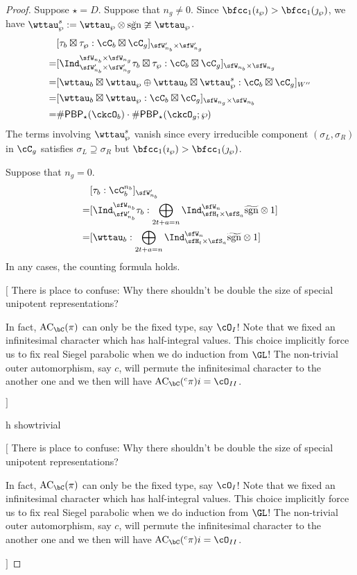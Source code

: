 \documentclass[12pt,a4paper]{amsart}
\newcommand{\trivial}[2][]{\if\relax\detokenize{#1}\relax
  {%
      \color{orange} \vspace{0em} $[$  #2 $]$
      \color{black}
  }
  \else
\ifx#1h
\ifcsname showtrivial\endcsname
{%
    \color{orange} \vspace{0em}  $[$ #2 $]$
    \color{black}
}
\fi
\else {\red Wrong argument!} \fi
\fi
}
\newcommand{\AC}{\mathrm{AC}}
\newcommand{\sgn}{\operatorname{sgn}}
\numberwithin{equation}{section}
\theoremstyle{remark}
\def\hsgn{\widetilde{\mathrm{sgn}}}
\def\PBP{\mathsf{PBP}}
\def\sP{\wp}
\def\brsgn{\breve{\sgn}}
\begin{document}
\begin{proof}
  \medskip

  Suppose $\star = D$.
  Suppose that $n_{g}\neq 0$.
  Since $\bfcc_{1}(\imath_{\wp})>\bfcc_{1}(\jmath_{\wp})$, we have
  $\wttau^{s}_{\wp}:=\wttau_{\wp}\otimes \brsgn\ncong\wttau_{\wp}$.
  \[
\begin{split}
  & [\tau_{b}\boxtimes \tau_{\wp} :
  \cC_{b} \boxtimes \cC_{g}]_{\sfW'_{n_{b}}\times \sfW'_{n_{g}}}\\
  = & [\Ind_{\sfW'_{n_{b}}\times \sfW'_{n_{g}}}^{\sfW_{n_{b}}\times \sfW_{n_{g}}} \tau_{b}\boxtimes \tau_{\wp} :
  \cC_{b} \boxtimes \cC_{g}]_{\sfW_{n_{b}}\times \sfW_{n_{g}}}\\
  = & [\wttau_{b}\boxtimes \wttau_{\wp}\oplus \wttau_{b}\boxtimes \wttau_{\wp}^{s}:
  \cC_{b} \boxtimes \cC_{g}]_{W''}\\
  = & [\wttau_{b}\boxtimes \wttau_{\wp}:
  \cC_{b} \boxtimes \cC_{g}]_{\sfW_{n_{g}}\times \sfW_{n_{b}}}\\
  =& \# \PBP_{\star}(\ckcO_{b})\cdot \# \PBP_{\star}(\ckcO_{g};\wp)
\end{split}
  \]
The terms involving $\wttau_{\sP}^{s}$ vanish since
every irreducible component $(\sigma_{L},\sigma_{R})$ in $\cC_{g}$ satisfies
    $\sigma_{L}\supseteq \sigma_{R}$ but $\bfcc_{1}(\imath_{\wp})>\bfcc_{1}(\jmath_{\wp})$.

  Suppose that $n_{g} =  0$.
  \[
    \begin{split}
      & [\tau_{b} : \cC_{b}^{n_{b}}]_{\sfW'_{n_{b}}}\\
      =& [\Ind_{\sfW'_{n_{b}}}^{\sfW_{n_{b}}} \tau_{b} : \bigoplus_{\substack{2t+a=n}}
      \Ind_{\sfH_{t}\times \sfS_{a}}^{\sfW_{n}} \hsgn\otimes 1] \\
      =& [ \wttau_{b} : \bigoplus_{\substack{2t+a=n}}
      \Ind_{\sfH_{t}\times \sfS_{a}}^{\sfW_{n}} \hsgn\otimes 1] \\
    \end{split}
  \]
  In any cases, the counting formula holds.
  \trivial{
    There is place to confuse: Why there shouldn't be
    double the size of special unipotent representations?

    In fact, $\AC_{\bC}(\pi)$ can only be the fixed type, say $\cO_{I}$! Note
    that we fixed an infinitesimal character which has half-integral values.
    This choice implicitly force us to fix real Siegel parabolic when we do
    induction from $\GL$! The non-trivial outer automorphism, say $c$, will
    permute the infinitesimal character to the another one and we then will have
    $\AC_{\bC}({}^{c}\pi)i = \cO_{II}$.


}
\end{proof}
\end{document}
